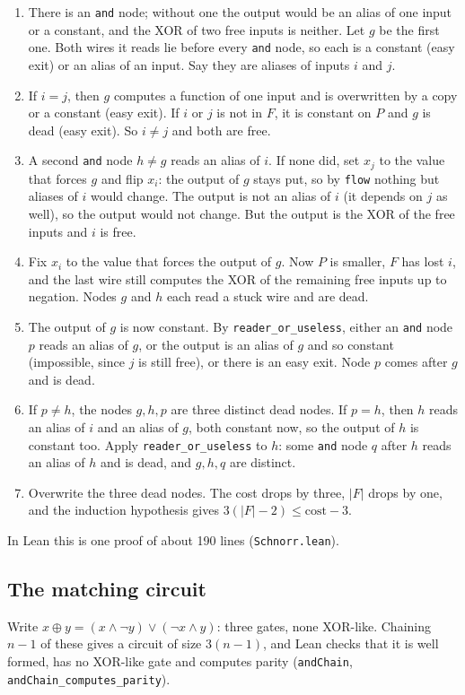 \documentclass[11pt]{amsart}
\theoremstyle{definition}
\theoremstyle{remark}
\newcommand{\lean}[1]{\texttt{#1}}
\begin{document}
\begin{enumerate}
\item There is an \lean{and} node; without one the output would be an alias of one input or a
  constant, and the XOR of two free inputs is neither. Let $g$ be the first one. Both wires it
  reads lie before every \lean{and} node, so each is a constant (easy exit) or an alias of an
  input. Say they are aliases of inputs $i$ and $j$.
\item If $i=j$, then $g$ computes a function of one input and is overwritten by a copy or a
  constant (easy exit). If $i$ or $j$ is not in $F$, it is constant on $P$ and $g$ is dead
  (easy exit). So $i\ne j$ and both are free.
\item A second \lean{and} node $h\ne g$ reads an alias of $i$. If none did, set $x_j$ to the
  value that forces $g$ and flip $x_i$: the output of $g$ stays put, so by \lean{flow} nothing
  but aliases of $i$ would change. The output is not an alias of $i$ (it depends on $j$ as
  well), so the output would not change. But the output is the XOR of the free inputs and $i$
  is free.
\item Fix $x_i$ to the value that forces the output of $g$. Now $P$ is smaller, $F$ has lost
  $i$, and the last wire still computes the XOR of the remaining free inputs up to negation.
  Nodes $g$ and $h$ each read a stuck wire and are dead.
\item The output of $g$ is now constant. By \lean{reader\_or\_useless}, either an \lean{and}
  node $p$ reads an alias of $g$, or the output is an alias of $g$ and so constant
  (impossible, since $j$ is still free), or there is an easy exit. Node $p$ comes after $g$ and is dead.
\item If $p\ne h$, the nodes $g,h,p$ are three distinct dead nodes. If $p=h$, then $h$ reads
  an alias of $i$ and an alias of $g$, both constant now, so the output of $h$ is constant
  too. Apply \lean{reader\_or\_useless} to $h$: some \lean{and} node $q$ after $h$ reads an
  alias of $h$ and is dead, and $g,h,q$ are distinct.
\item Overwrite the three dead nodes. The cost drops by three, $|F|$ drops by one, and the
  induction hypothesis gives $3(|F|-2)\le \text{cost}-3$.
\end{enumerate}

In Lean this is one proof of about 190 lines (\lean{Schnorr.lean}).

\subsection{The matching circuit}
Write $x\oplus y=(x\wedge\neg y)\vee(\neg x\wedge y)$: three gates, none XOR-like. Chaining
$n-1$ of these gives a circuit of size $3(n-1)$, and Lean checks that it is well formed, has
no XOR-like gate and computes parity (\lean{andChain}, \lean{andChain\_computes\_parity}).
\end{document}
